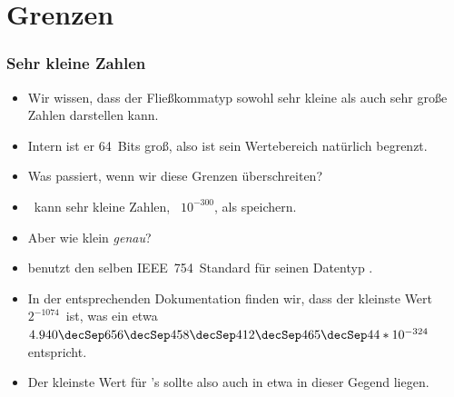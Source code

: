 \documentclass[aspectratio=169,mathserif,notheorems]{beamer}%
\begin{document}
\section{Grenzen}%
%
\begin{frame}%
\frametitle{Sehr kleine Zahlen}%
\begin{itemize}%
\item Wir wissen, dass der Fließkommatyp  sowohl sehr kleine als auch sehr große Zahlen darstellen kann.%
\item<2-> Intern ist er 64~Bits groß, also ist sein Wertebereich natürlich begrenzt.%
\item<3-> Was passiert, wenn wir diese Grenzen überschreiten?%
\item<4-> \python\ kann sehr kleine Zahlen, \DEzB~$10^{-300}$, als  speichern.%
\item<5-> Aber wie klein \emph{genau}?%
\item<6->  benutzt den selben IEEE~754~Standard für seinen Datentyp .%
\item<7-> In der entsprechenden Dokumentation finden wir, dass der kleinste Wert $2^{-1074}$~ist, was ein etwa~$4.940\decSep656\decSep458\decSep412\decSep465\decSep44*10^{-324}$ entspricht.%
\item<8-> Der kleinste Wert für \python's  sollte also auch in etwa in dieser Gegend liegen.%
\end{itemize}%
\end{frame}%
%
\end{document}
